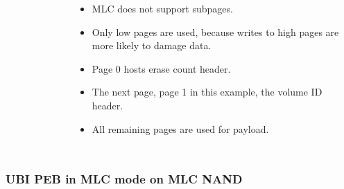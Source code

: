 \documentclass[aspectratio=169,obeyspaces,spaces,hyphens,dvipsnames]{beamer}
\begin{document}
\begin{frame}[fragile]
\begin{columns}
\begin{figure}
     \end{figure}
    \begin{itemize}
    \item MLC does not support subpages.
    \item Only low pages are used, because writes to high pages are more
	  likely to damage data.
    \item Page 0 hosts erase count header.
    \item The next page, page 1 in this example, the volume ID header.
    \item All remaining pages are used for payload.
    \end{itemize}
   \end{columns}
\end{frame}

\begin{frame}[fragile]
\frametitle{UBI PEB in MLC mode on MLC NAND}
   \begin{columns}
     \begin{figure}

\end{figure}
\end{columns}
\end{frame}
\end{document}

